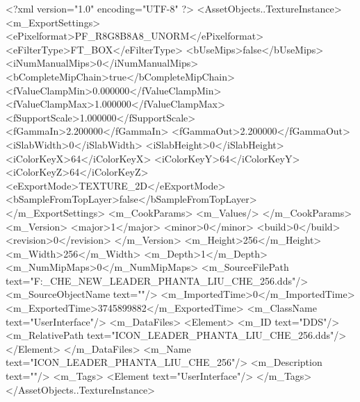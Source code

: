 <?xml version="1.0" encoding="UTF-8" ?>
<AssetObjects..TextureInstance>
	<m_ExportSettings>
		<ePixelformat>PF_R8G8B8A8_UNORM</ePixelformat>
		<eFilterType>FT_BOX</eFilterType>
		<bUseMips>false</bUseMips>
		<iNumManualMips>0</iNumManualMips>
		<bCompleteMipChain>true</bCompleteMipChain>
		<fValueClampMin>0.000000</fValueClampMin>
		<fValueClampMax>1.000000</fValueClampMax>
		<fSupportScale>1.000000</fSupportScale>
		<fGammaIn>2.200000</fGammaIn>
		<fGammaOut>2.200000</fGammaOut>
		<iSlabWidth>0</iSlabWidth>
		<iSlabHeight>0</iSlabHeight>
		<iColorKeyX>64</iColorKeyX>
		<iColorKeyY>64</iColorKeyY>
		<iColorKeyZ>64</iColorKeyZ>
		<eExportMode>TEXTURE_2D</eExportMode>
		<bSampleFromTopLayer>false</bSampleFromTopLayer>
	</m_ExportSettings>
	<m_CookParams>
		<m_Values/>
	</m_CookParams>
	<m_Version>
		<major>1</major>
		<minor>0</minor>
		<build>0</build>
		<revision>0</revision>
	</m_Version>
	<m_Height>256</m_Height>
	<m_Width>256</m_Width>
	<m_Depth>1</m_Depth>
	<m_NumMipMaps>0</m_NumMipMaps>
	<m_SourceFilePath text="F:\MOD\TEMPLATE\LIU_CHE_NEW\ICON_LEADER_PHANTA_LIU_CHE_256.dds"/>
	<m_SourceObjectName text=""/>
	<m_ImportedTime>0</m_ImportedTime>
	<m_ExportedTime>3745899882</m_ExportedTime>
	<m_ClassName text="UserInterface"/>
	<m_DataFiles>
		<Element>
			<m_ID text="DDS"/>
			<m_RelativePath text="ICON_LEADER_PHANTA_LIU_CHE_256.dds"/>
		</Element>
	</m_DataFiles>
	<m_Name text="ICON_LEADER_PHANTA_LIU_CHE_256"/>
	<m_Description text=""/>
	<m_Tags>
		<Element text="UserInterface"/>
	</m_Tags>
</AssetObjects..TextureInstance>

